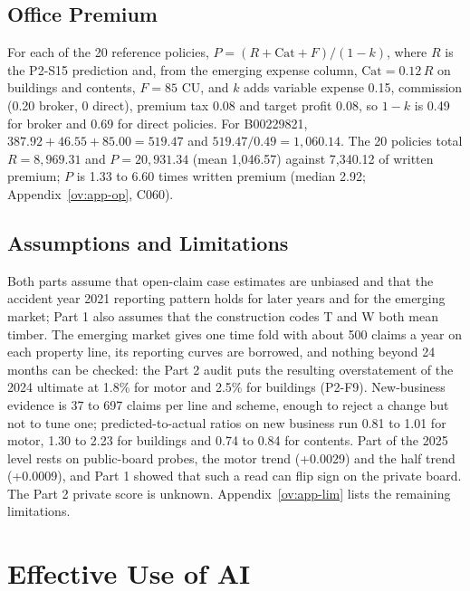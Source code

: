 \subsection{Office Premium}

For each of the 20 reference policies, $P = (R + \mathrm{Cat} + F)/(1-k)$, where $R$ is the P2-S15 prediction and, from the emerging expense
column, $\mathrm{Cat} = 0.12\,R$ on buildings and contents, $F = 85$ CU, and
$k$ adds variable expense 0.15, commission (0.20 broker, 0 direct), premium tax 0.08 and target profit 0.08, so
$1-k$ is 0.49 for broker and 0.69 for direct policies. For B00229821, $387.92 + 46.55 + 85.00 = 519.47$ and
$519.47 / 0.49 = 1{,}060.14$. The 20 policies total $R = 8{,}969.31$ and $P = 20{,}931.34$ (mean 1,046.57) against
7,340.12 of written premium; $P$ is 1.33 to 6.60 times written premium (median 2.92; Appendix~\ref{ov:app-op}, C060).

\subsection{Assumptions and Limitations}

Both parts assume that open-claim case estimates are unbiased and that the accident year 2021 reporting pattern holds
for later years and for the emerging market; Part 1 also assumes that the construction codes T and W both mean timber.
The emerging market gives one time fold with about 500 claims a year on each property line, its reporting curves are
borrowed, and nothing beyond 24 months can be checked: the Part 2 audit puts the resulting overstatement of the 2024
ultimate at 1.8\% for motor and 2.5\% for buildings (P2-F9). New-business evidence is 37 to 697 claims per line and
scheme, enough to reject a change but not to tune one; predicted-to-actual ratios on new business run 0.81 to 1.01 for
motor, 1.30 to 2.23 for buildings and 0.74 to 0.84 for contents. Part of the 2025 level rests on public-board probes,
the motor trend (+0.0029) and the half trend (+0.0009), and Part 1 showed that such a read can flip sign on the private
board. The Part 2 private score is unknown. Appendix~\ref{ov:app-lim} lists the remaining limitations.


\section{Effective Use of AI}


